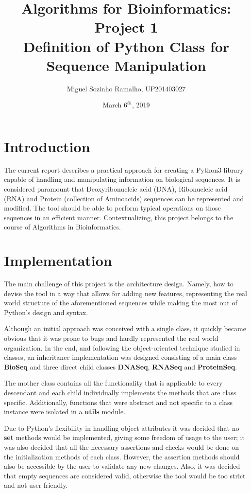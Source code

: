 \documentclass[11pt]{article}
\begin{document}
\author{Miguel Sozinho Ramalho, UP201403027}
\date{March $6^{th}$, 2019}
\title{Algorithms for Bioinformatics: Project 1\\Definition of Python Class for Sequence Manipulation}
\maketitle


\section{Introduction}
The current report describes a practical approach for creating a Python3 library capable of handling and manipulating information on biological sequences. It is considered paramount that Deoxyribonucleic acid (DNA), Ribonucleic acid (RNA) and Protein (collection of Aminoacids) sequences can be represented and modified. The tool should be able to perform typical operations on those sequences in an efficient manner. Contextualizing, this project belongs to the course of Algorithms in Bioinformatics.

\section{Implementation}
The main challenge of this project is the architecture design. Namely, how to devise the tool in a way that allows for adding new features, representing the real world structure of the aforementioned sequences while making the most out of Python's design and syntax. 

Although an initial approach was conceived with a single class, it quickly became obvious that it was prone to bugs and hardly represented the real world organization. In the end, and following the object-oriented technique studied in classes, an inheritance implementation was designed consisting of a main class \textbf{BioSeq} and three direct child classes \textbf{DNASeq}, \textbf{RNASeq} and \textbf{ProteinSeq}. 

The mother class contains all the functionality that is applicable to every descendant and each child individually implements the methods that are class specific. Additionally, functions that were abstract and not specific to a class instance were isolated in a \textbf{utils} module.

Due to Python's flexibility in handling object attributes it was decided that no \textbf{set} methods would be implemented, giving some freedom of usage to the user; it was also decided that all the necessary assertions and checks would be done on the initialization methods of each class. However, the assertion methods should also be accessible by the user to validate any new changes. Also, it was decided that empty sequences are considered valid, otherwise the tool would be too strict and not user friendly.
\end{document}
